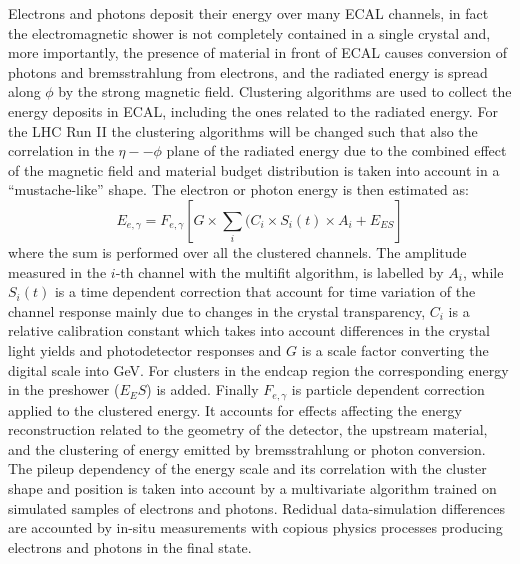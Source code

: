 \documentclass[journal]{IEEEtran}
\begin{document}
Electrons and photons deposit their energy over many ECAL channels, in fact the electromagnetic shower is not completely contained in a single crystal and, more importantly, the presence of material in front of ECAL causes conversion of photons and bremsstrahlung from electrons, and the radiated energy is spread along $\phi$ by the strong magnetic field. Clustering algorithms are used to collect the energy deposits in ECAL, including the ones related to the radiated energy. For the LHC Run II the clustering algorithms will be changed such that also the correlation in the $\eta--\phi$ plane of the radiated energy due to the combined effect of the magnetic field and material budget distribution is taken into account in a ``mustache-like'' shape. The electron or photon energy is then estimated as:
\begin{equation}
E_{e,\gamma} = F_{e,\gamma}\left[G \times \sum_i(C_i \times S_i(t) \times A_i + E_{ES}\right]
\end{equation}
where the sum is performed over all the clustered channels. The amplitude measured in the $i$-th channel with the multifit algorithm, is labelled by $A_i$, while $S_i(t)$ is a time dependent correction that account for time variation of the channel response mainly due to changes in the crystal transparency, $C_i$ is a relative calibration constant which takes into account differences in the crystal light yields and photodetector responses and $G$ is a scale factor converting the digital scale into GeV. For clusters in the endcap region the corresponding energy in the preshower ($E_ES$) is added. Finally $F_{e,\gamma}$ is particle dependent correction applied to the clustered energy. It accounts for effects affecting the energy reconstruction related to the geometry of the detector, the upstream material, and the clustering of energy emitted by bremsstrahlung or photon conversion. The pileup dependency of the energy scale and its correlation with the cluster shape and position is taken into account by a multivariate algorithm trained on simulated samples of electrons and photons.  Redidual data-simulation differences are accounted by in-situ measurements with copious physics processes producing electrons and photons in the final state.
\end{document}

